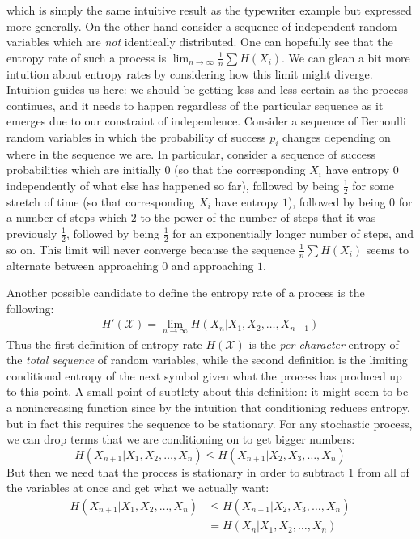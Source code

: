 \documentclass{article}
\theoremstyle{definition}
\theoremstyle{plain}
\begin{document}
which is simply the same intuitive result as the typewriter example but expressed more generally. On the other hand consider a sequence of independent random variables which are \emph{not} identically distributed. One can hopefully see that the entropy rate of such a process is $\lim_{n \to \infty} \frac{1}{n}\sum H(X_i)$. We can glean a bit more intuition about entropy rates by considering how this limit might diverge. Intuition guides us here: we should be getting less and less certain as the process continues, and it needs to happen regardless of the particular sequence as it emerges due to our constraint of independence. Consider a sequence of Bernoulli random variables in which the probability of success $p_i$ changes depending on where in the sequence we are. In particular, consider a sequence of success probabilities which are initially $0$ (so that the corresponding $X_i$ have entropy $0$ independently of what else has happened so far), followed by being $\frac{1}{2}$ for some stretch of time (so that corresponding $X_i$ have entropy $1$), followed by being $0$ for a number of steps which $2$ to the power of the number of steps that it was previously $\frac{1}{2}$, followed by being $\frac{1}{2}$ for an exponentially longer number of steps, and so on. This limit will never converge because the sequence $\frac{1}{n}\sum H(X_i)$ seems to alternate between approaching $0$ and approaching $1$. \par 
Another possible candidate to define the entropy rate of a process is the following:
\begin{align}
	H'(\mathcal{X}) = \lim_{n \to \infty} H(X_n|X_1,X_2,\ldots,X_{n-1}) 
\end{align} 
Thus the first definition of entropy rate $H(\mathcal{X})$ is the \emph{per-character} entropy of the \emph{total sequence} of random variables, while the second definition is the limiting conditional entropy of the next symbol given what the process has produced up to this point. A small point of subtlety about this definition: it might seem to be a nonincreasing function since by the intuition that conditioning reduces entropy, but in fact this requires the sequence to be stationary. For any stochastic process, we can drop terms that we are conditioning on to get bigger numbers:
\[ H(X_{n+1}|X_1,X_2,\ldots,X_n) \leq H(X_{n+1}|X_2,X_3,\ldots,X_n) \]
But then we need that the process is stationary in order to subtract $1$ from all of the variables at once and get what we actually want:
\begin{align}
	H(X_{n+1}|X_1,X_2,\ldots,X_n) &\leq H(X_{n+1}|X_2,X_3,\ldots,X_n) \\
								&= H(X_n|X_1,X_2,\ldots,X_n)
\end{align}
\end{document}
